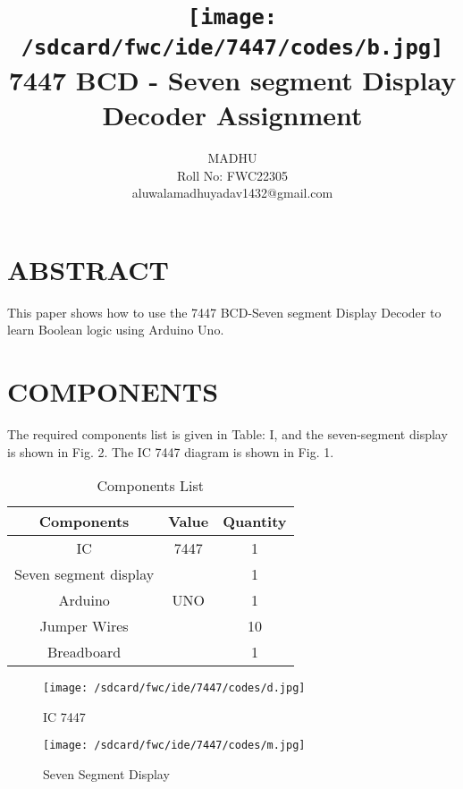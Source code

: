 \documentclass[conference]{IEEEtran}
\title{
\vspace{1cm}
{\texttt{[image: /sdcard/fwc/ide/7447/codes/b.jpg]} \\ 
7447 BCD - Seven segment Display Decoder Assignment} }
\author{MADHU\\ Roll No: FWC22305 \\aluwalamadhuyadav1432@gmail.com}
\begin{document}
\maketitle

\section{ABSTRACT}
This paper shows how to use the 7447 BCD-Seven segment Display Decoder to learn Boolean logic using Arduino Uno.

\section{COMPONENTS}
The required components list is given in Table: I, and the seven-segment display is shown in Fig. 2. The IC 7447 diagram is shown in Fig. 1.
\vspace{0.3cm}

\begin{table}[htbp]
\centering
\begin{tabular}{| c | c | c |}
\hline
Components & Value & Quantity \\
\hline
IC & 7447 & 1 \\
\hline
Seven segment display & & 1 \\
\hline
Arduino & UNO & 1 \\
\hline
Jumper Wires & & 10 \\
\hline
Breadboard & & 1 \\
\hline
\end{tabular}
\vspace{0.3cm}
\caption{\label{tab:widgets} Components List}
\end{table}

\begin{figure}[htbp]                           
\centering                            
\texttt{[image: /sdcard/fwc/ide/7447/codes/d.jpg]}                      
\caption{\label{fig-1:Gates} IC 7447}           
\end{figure}

\begin{figure}[htbp]                           
\centering                                 
\texttt{[image: /sdcard/fwc/ide/7447/codes/m.jpg]}                                           
\caption{\label{fig-2:Gates} Seven Segment Display}               
\end{figure}
\end{document}
